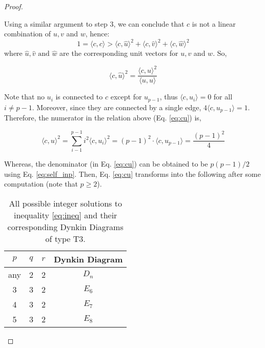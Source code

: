 \begin{proof}
\begin{enumerate}
        Using a similar argument to step 3, we can conclude that $c$ is not a linear combination of $u, v$ and $w$, hence:
        \begin{equation}
            \label{eq:cc_inp}
            1 = \langle c, c \rangle >  \langle c, \hat u \rangle^2 + \langle c, \hat v\rangle^2 + \langle c, \hat w \rangle^2
        \end{equation}
        where $\hat u, \hat v \text{ and } \hat w$ are the corresponding unit vectors for $u, v$ and $w$. So, 

        \begin{equation}
            \label{eq:cu}
            \langle c, \hat u \rangle^2 = \frac{\langle c, u \rangle^2}{\langle u, u \rangle}
        \end{equation}

        Note that no $u_i$ is connected to $c$ except for $u_{p-1}$, thus $ \langle c, u_i \rangle = 0$ for all $i \not= p-1$.
        Moreover, since they are connected by a single edge, $4 \langle c, u_{p-1} \rangle = 1$. Therefore, the numerator in
        the relation above (Eq. \ref{eq:cu}) is,

        \begin{equation*}
            \langle c, u \rangle ^2 = \sum_{i-1}^{p-1} i^2 \langle c, u_i \rangle^2 = (p-1)^2 \cdot \langle c, u_{p-1} \rangle = \frac{(p-1)^2}{4}
        \end{equation*}

        Whereas, the denominator (in Eq. \ref{eq:cu}) can be obtained to be $p(p-1) /2$ using Eq. \ref{eq:self_inp}. Then, 
        Eq. \ref{eq:cu} transforms into the following after some computation (note that $p \geq 2$).

        \begin{table}[h]
        \label{table:sol}
        \begin{center}
        \begin{tabular}{|| c | c | c | c ||}
            \hline $p$ & $q$ & $r$ & Dynkin Diagram\\ \hline
            any & 2 & 2 & $D_n$ \\ \hline
            3 & 3 & 2 & $E_6$ \\ \hline
            4 & 3 & 2 & $E_7$ \\ \hline
            5 & 3 & 2 & $E_8$ \\ \hline
        \end{tabular}
        \end{center}
        \caption{All possible integer solutions to inequality \ref{eq:ineq} and their corresponding Dynkin Diagrams of type T3.}
        \end{table}


\end{enumerate}
\end{proof}
